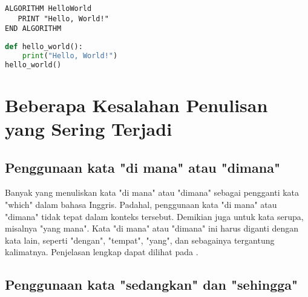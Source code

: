 \documentclass[12pt,a4paper,oneside]{book}
\begin{document}
\begin{minipage}{\textwidth} 
\begin{lstlisting}[frame=lines, captionpos=t, caption={Contoh pseudocode}, label={alg:contoh1}]
ALGORITHM HelloWorld
   PRINT "Hello, World!"
END ALGORITHM
\end{lstlisting}
\end{minipage}

\begin{minipage}{\textwidth}
\begin{lstlisting}[language=Python, frame=single, caption={Contoh source code Python}, captionpos=t, label={lst:contoh1}]
def hello_world():
    print("Hello, World!")       
hello_world()
\end{lstlisting}
\end{minipage}


\section{Beberapa Kesalahan Penulisan yang Sering Terjadi}
\subsection{Penggunaan kata "di mana" atau "dimana"}
Banyak yang menuliskan kata "di mana" atau "dimana" sebagai pengganti kata "which" dalam bahasa Inggris. 
Padahal, penggunaan kata "di mana" atau "dimana" tidak tepat dalam konteks tersebut. Demikian juga untuk kata serupa, misalnya "yang mana".
Kata "di mana" atau "dimana" ini harus diganti dengan kata lain, seperti "dengan", "tempat", "yang", dan sebagainya tergantung kalimatnya.
Penjelasan lengkap dapat dilihat pada \autocite{BPBI}.

\subsection{Penggunaan kata "sedangkan" dan "sehingga"}
\end{document}
